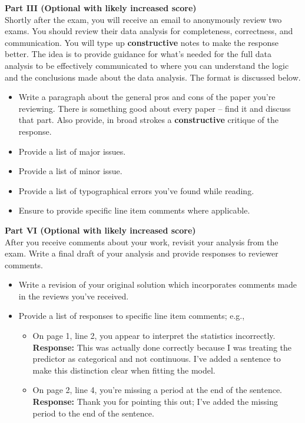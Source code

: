 \documentclass{article}
\begin{document}
\noindent \textbf{Part III (Optional with likely increased score)}\\
Shortly after the exam, you will receive an email to anonymously review two exams.
You should review their data analysis for completeness, correctness, and 
communication. You will type up \textbf{constructive} notes to make the response better. 
The idea is to provide guidance for what's needed for the full data analysis to be effectively 
communicated to where you can understand the logic and the conclusions made about the data analysis.
The format is discussed below.
\begin{itemize}
  \item Write a paragraph about the general pros and cons of the paper you're reviewing. There 
  is something good about every paper -- find it and discuss that part. Also provide, in broad strokes a 
  \textbf{constructive} critique of the response. 
  \item Provide a list of major issues.
  \item Provide a list of minor issue.
  \item Provide a list of typographical errors you've found while reading.
  \item Ensure to provide specific line item comments where applicable.
\end{itemize}

\noindent \textbf{Part VI (Optional with likely increased score)}\\
After you receive comments about your work, revisit your analysis from the exam. 
Write a final draft of your analysis and provide responses to reviewer comments.
\begin{itemize}
  \item Write a revision of your original solution which incorporates comments made
  in the reviews you've received.
  \item Provide a list of responses to specific line item comments; e.g.,
  \begin{itemize}
    \item On page 1, line 2, you appear to interpret the statistics incorrectly.\\
        \textbf{Response:} This was actually done correctly because I was treating 
        the predictor as categorical and not continuous. I've added a sentence to
        make this distinction clear when fitting the model.
    \item On page 2, line 4, you're missing a period at the end of the sentence.\\
        \textbf{Response:} Thank you for pointing this out; I've added the missing
        period to the end of the sentence.
  \end{itemize}
\end{itemize}
\newpage
\end{document}
